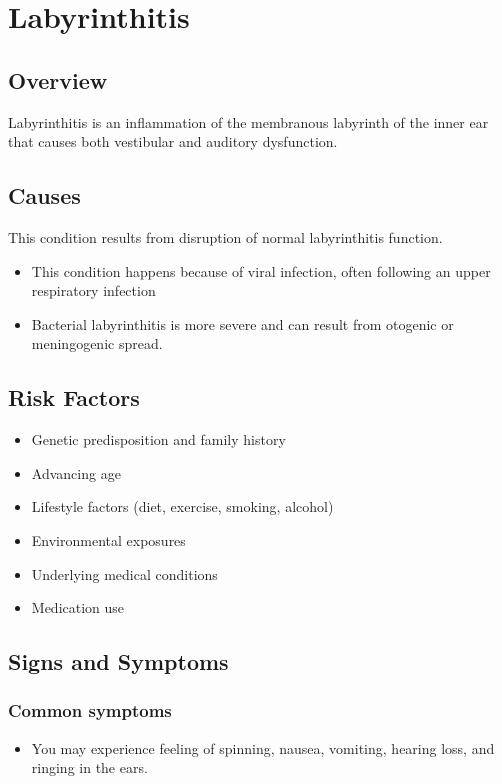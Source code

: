 \chapter{Labyrinthitis}
\label{sec:Labyrinthitis}

\section{Overview}
Labyrinthitis is an inflammation of the membranous labyrinth of the inner ear that causes both vestibular and auditory dysfunction.
\section{Causes}
This condition results from disruption of normal labyrinthitis function.

\begin{itemize}[noitemsep]
  \item This condition happens because of viral infection, often following an upper respiratory infection
  \item Bacterial labyrinthitis is more severe and can result from otogenic or meningogenic spread.
\end{itemize}
\section{Risk Factors}


\begin{itemize}[noitemsep]
  \item Genetic predisposition and family history
  \item Advancing age
  \item Lifestyle factors (diet, exercise, smoking, alcohol)
  \item Environmental exposures
  \item Underlying medical conditions
  \item Medication use
\end{itemize}
\section{Signs and Symptoms}

\subsection{Common symptoms}
\begin{itemize}[noitemsep]
  \item You may experience feeling of spinning, nausea, vomiting, hearing loss, and ringing in the ears. 
  \end{itemize}

